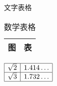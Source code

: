 \begin{table}
\parbox[b]{.5\textwidth}{\centering
  \caption{文字表格}
  \begin{tabular}{|c|c|}
    \hline 图 & 表 \\ \hline
  \end{tabular}}%
\parbox[b]{.5\textwidth}{\centering
  \caption{数学表格}
  $\begin{array}{|c|c|}
    \hline \sqrt{2} & 1.414\dots \\ \hline
    \sqrt{3} & 1.732\dots \\ \hline
  \end{array}$}
\end{table}
